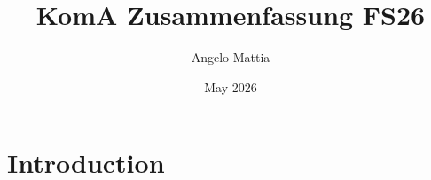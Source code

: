 \documentclass{article}
\title{KomA Zusammenfassung FS26}
\author{Angelo Mattia}
\date{May 2026}
\begin{document}
\maketitle

\section{Introduction}
\end{document}
